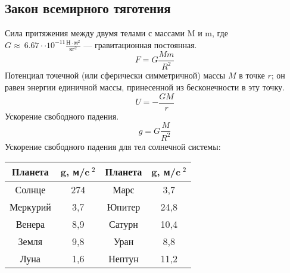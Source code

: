 \subsection{Закон всемирного тяготения}
Сила притяжения между двумя телами с массами M и m, 
где $G\approx\ 6.67\cdot \cdot10^{-11}\frac{\text{Н}
\cdot \text{м}^2}{\text{кг}^2}$ --- гравитационная 
постоянная.\begin{equation}
	F=G\frac{Mm}{R^2}
\end{equation}
Потенциал точечной (или сферически симметричной) массы 
$M$ в точке $r$; он равен энергии единичной массы, 
принесенной из бесконечности в эту точку.\begin{equation}
U=-\frac{GM}{r}
\end{equation}
Ускорение свободного падения.\begin{equation}
	g = G \frac{M}{R^2}
\end{equation}
Ускорение свободного падения для тел солнечной системы:
\begin{table}[h!]
\centering
\begin{tabular}{|c|c|c|c|}
\hline 
\textbf{Планета} & $\mathbf{g}$, \textbf{м/c$~^2$} 
& \textbf{Планета} & $\mathbf{g}$, \textbf{м/c$~^2$}\\
\hline
Солнце & 274 & Марс & 3,7\\
\hline
Меркурий & 3,7 & Юпитер & 24,8\\
\hline
Венера & 8,9 & Сатурн & 10,4\\
\hline
Земля & 9,8 & Уран & 8,8\\
\hline
Луна & 1,6 & Нептун & 11,2\\
\hline
\end{tabular}
\end{table}